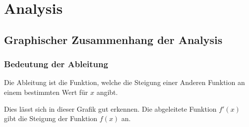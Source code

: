 \documentclass[a4paper,11pt]{report}
\begin{document}
\begin{titlepage}
    {\newUpperTitleFont\thetitle\par}
    \vspace{1cm}

    {\theauthor\par}
    \vspace{.5cm}

    {\thedate\par}
    \vspace{5cm}

\end{titlepage}
\part{Analysis}
\chapter{Graphischer Zusammenhang der Analysis}
\section{Bedeutung der Ableitung}
Die Ableitung ist die Funktion, welche die Steigung einer Anderen Funktion an einem bestimmten Wert für $x$ angibt. \\
\begin{center}
\end{center}

Dies lässt sich in dieser Grafik gut erkennen. Die abgeleitete Funktion $f'(x)$ gibt die Steigung der Funktion $f(x)$ an.
\end{document}
